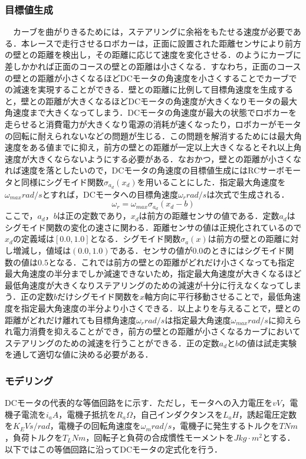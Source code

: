 \subsubsection{目標値生成}
　カーブを曲がりきるためには，ステアリングに余裕をもたせる速度が必要である．本レースで走行させるロボカーは，正面に設置された距離センサにより前方の壁との距離を検出し，その距離に応じて速度を変化させる．のようにカーブに差しかかれば正面のコースの壁との距離は小さくなる．すなわち，正面のコースの壁との距離が小さくなるほどDCモータの角速度を小さくすることでカーブでの減速を実現することができる．壁との距離に比例して目標角速度を生成すると，壁との距離が大きくなるほどDCモータの角速度が大きくなりモータの最大角速度まで大きくなってしまう．DCモータの角速度が最大の状態でロボカーを走らせると消費電力が大きくなり電源の消耗が速くなったり，ロボカーがモータの回転に耐えられないなどの問題が生じる．この問題を解消するためには最大角速度をある値までに抑え，前方の壁との距離が一定以上大きくなるとそれ以上角速度が大きくならないようにする必要がある．なおかつ，壁との距離が小さくなれば速度を落としたいので，DCモータの角速度の目標値生成にはRCサーボモータと同様にシグモイド関数$\sigma_{a_{d}}(x_{d})$を用いることにした．指定最大角速度を$\omega_{max}\unit{rad/s} $とすれば，DCモータへの目標角速度$\omega_{r}\unit{rad/s}$は次式で生成される．
\begin{equation}
 \omega_{r}=\omega_{max}\sigma_{a_{d}}(x_{d}-b)\label{eq::omega_r}
\end{equation}
ここで，$a_{d}$，$b$は正の定数であり，$x_{d}$は前方の距離センサの値である．定数$a_{d}$はシグモイド関数の変化の速さに関わる．距離センサの値は正規化されているので$x_{d}$の定義域は$[0.0,1.0]$となる．シグモイド関数$\sigma_{a}(x)$は前方の壁との距離に対し増減し，値域は$(0.0,1.0)$である．センサの値が$0.0$のときにはシグモイド関数の値は$0.5$となる．これでは前方の壁との距離がどれだけ小さくなっても指定最大角速度の半分までしか減速できないため，指定最大角速度が大きくなるほど最低角速度が大きくなりステアリングのための減速が十分に行えなくなってしまう．正の定数$b$だけシグモイド関数を$x$軸方向に平行移動させることで，最低角速度を指定最大角速度の半分より小さくできる．以上よりを与えることで，壁との距離がどれだけ離れても目標角速度$\omega_{r}\unit{rad/s}$は指定最大角速度$\omega_{max}\unit{rad/s}$に抑えられ電力消費を抑えることができ，前方の壁との距離が小さくなるカーブにおいてステアリングのための減速を行うことができる．正の定数$a_{d}$と$b$の値は試走実験を通して適切な値に決める必要がある．

\subsubsection{モデリング}
DCモータの代表的な等価回路をに示す．\cite{dcmmodeling}ただし，モータへの入力電圧を$v\unit{V}$，電機子電流を$i_{a}\unit{A}$，電機子抵抗を$R_{a}\unit{\Omega}$，自己インダクタンスを$L_{a}\unit{H}$，誘起電圧定数を$K_{E}\unit{Vs/rad}$，電機子の回転角速度を$\omega_{m}\unit{rad/s}$，電機子に発生するトルクを$T\unit{Nm}$，負荷トルクを$T_L\unit{Nm}$，回転子と負荷の合成慣性モーメントを$J\unit{kg\cdot m^2}$とする．以下ではこの等価回路に沿ってDCモータの定式化を行う．

